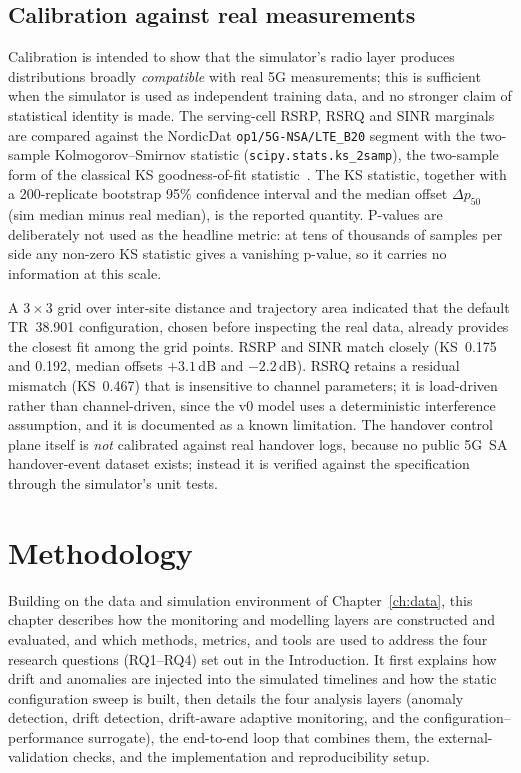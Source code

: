 \section{Calibration against real measurements}
\label{sec:calibration}

Calibration is intended to show that the simulator's radio layer produces
distributions broadly \emph{compatible} with real 5G measurements; this is
sufficient when the simulator is used as independent training data, and no
stronger claim of statistical identity is made. The serving-cell RSRP, RSRQ
and SINR marginals are compared against the NordicDat \texttt{op1/5G-NSA/LTE\_B20}
segment with the two-sample Kolmogorov--Smirnov statistic
(\texttt{scipy.stats.ks\_2samp}), the two-sample form of the classical KS
goodness-of-fit statistic~\cite{massey1951ks}. The KS statistic, together
with a 200-replicate bootstrap 95\% confidence interval and the median offset
$\Delta p_{50}$ (sim median minus real median), is the reported quantity.
P-values are deliberately not used as the headline metric: at tens of thousands
of samples per side any non-zero KS statistic gives a vanishing p-value, so it
carries no information at this scale.

A $3\times3$ grid over inter-site distance and trajectory area indicated that the
default TR~38.901 configuration, chosen before inspecting the real data, already
provides the closest fit among the grid points. RSRP and SINR match closely
(KS~0.175 and 0.192, median offsets $+3.1$\,dB and $-2.2$\,dB). RSRQ retains a
residual mismatch (KS~0.467)
that is insensitive to channel parameters; it is load-driven rather than
channel-driven, since the v0 model uses a deterministic interference assumption,
and it is documented as a known limitation. The handover control plane itself is
\emph{not} calibrated against real handover logs, because no public 5G~SA
handover-event dataset exists; instead it is verified against the specification
through the simulator's unit tests.

\chapter{Methodology}
\label{ch:method}

Building on the data and simulation environment of Chapter~\ref{ch:data}, this
chapter describes how the monitoring and modelling layers are constructed and
evaluated, and which methods, metrics, and tools are used to address the four
research questions (RQ1--RQ4) set out in the Introduction. It first explains how
drift and anomalies are injected into the simulated timelines and how the static
configuration sweep is built, then details the four analysis layers (anomaly
detection, drift detection, drift-aware adaptive monitoring, and the
configuration--performance surrogate), the end-to-end loop that combines them,
the external-validation checks, and the implementation and reproducibility
setup.

